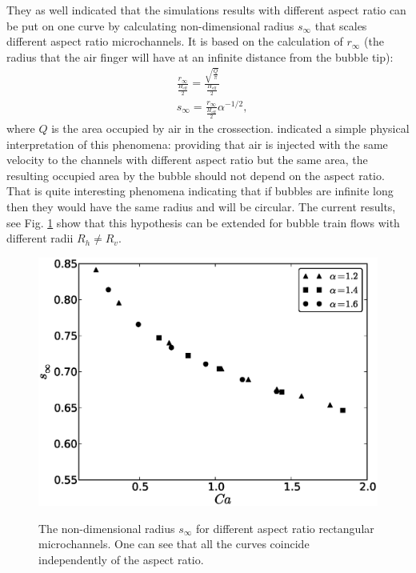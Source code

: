 \documentclass[preprint,12pt]{elsarticle}
\begin{document}
They as well indicated that the simulations results with different aspect ratio can be
put on one curve by calculating non-dimensional radius $s_{\infty}$ that scales different aspect
ratio microchannels. It is based on the calculation of  $r_{\infty}$ (the radius that the air
finger will have at an infinite distance from the bubble tip):
\begin{equation}
\begin{aligned}
&\frac{r_{\infty}}{\frac{H_{\mathrm{eff}}}{2}}=\frac{\sqrt{\frac{Q}{\pi}}}{\frac{H_{\mathrm{eff}}}{2
} }\\
&s_{\infty}=\frac{r_{\infty}}{\frac{H_{\mathrm{eff}}}{2}}\alpha^{-1/2},
\end{aligned}
\end{equation}
where $Q$ is the area occupied by air in the crossection. \citet{heil-threedim} indicated a simple
physical interpretation of this phenomena:  providing that air is injected with the same
velocity to the channels with different aspect ratio but the same area, the resulting occupied area by the bubble
should not depend on the aspect ratio. That is quite interesting phenomena indicating that if bubbles are infinite long then they would have the same radius and will be circular. The current results, see Fig. \ref{fig:one:curve} show that
this hypothesis can be extended for bubble train flows with different radii $R_h \neq R_v$. 
\begin{figure}[htb!]
\includegraphics[width=\textwidth]{onecurve.eps}\\
\caption{The non-dimensional radius $s_{\infty}$ for different aspect ratio
rectangular microchannels. One can see that all the curves coincide
independently of the aspect ratio.\label{fig:one:curve}}
\end{figure}
\end{document}
